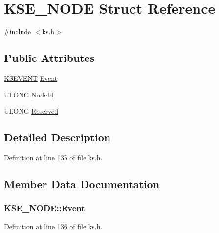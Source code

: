 \hypertarget{struct_k_s_e___n_o_d_e}{}\section{K\+S\+E\+\_\+\+N\+O\+DE Struct Reference}
\label{struct_k_s_e___n_o_d_e}


{\ttfamily \#include $<$ks.\+h$>$}

\subsection*{Public Attributes}
\begin{DoxyCompactItemize}
\item 
\hyperlink{ks_8h_a4ce55f771904d86bc71007c0e5876285}{K\+S\+E\+V\+E\+NT} \hyperlink{struct_k_s_e___n_o_d_e_a4cb64f73520b29b7b62d3710f2116536}{Event}
\item 
U\+L\+O\+NG \hyperlink{struct_k_s_e___n_o_d_e_ac1c51c2e8b05532a521623aeea149ea0}{Node\+Id}
\item 
U\+L\+O\+NG \hyperlink{struct_k_s_e___n_o_d_e_acd7c218fedb770934488ce65586aaddc}{Reserved}
\end{DoxyCompactItemize}


\subsection{Detailed Description}


Definition at line 135 of file ks.\+h.



\subsection{Member Data Documentation}
\subsubsection[{\texorpdfstring{Event}{Event}}]{ K\+S\+E\+\_\+\+N\+O\+D\+E\+::\+Event}\hypertarget{struct_k_s_e___n_o_d_e_a4cb64f73520b29b7b62d3710f2116536}{}\label{struct_k_s_e___n_o_d_e_a4cb64f73520b29b7b62d3710f2116536}


Definition at line 136 of file ks.\+h.

